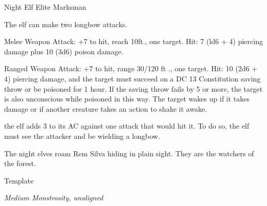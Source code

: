\begin{monsterbox}{Night Elf Elite Marksman}
	\begin{monsteraction}[Multiattack]
		The elf can make two longbow attacks.
	\end{monsteraction}
	\begin{monsteraction}[Shortsword]
		Melee Weapon Attack: +7 to hit, reach 10ft., one target. Hit: 7 (ld6 + 4) piercing damage plus 10 (3d6) poison damage.
	\end{monsteraction}
	\begin{monsteraction}[Longbow]
		Ranged Weapon Attack: +7 to hit, range 30/120 ft ., one target. Hit: 10 (2d6 + 4) piercing damage, and the target must succeed on a DC 13 Constitution saving throw or	be poisoned for 1 hour. If the saving throw fails by 5 or more,	the target is also unconscious while poisoned in this way. The target wakes up if it takes damage or if another creature takes an action to shake it awake.
	\end{monsteraction}
	\begin{monsteraction}
		the elf adds 3 to its AC against one attack that would hit it. To do so, the elf must see the attacker and be
		wielding a longbow.
	\end{monsteraction}
	The night elves roam Rem Silva hiding in plain sight. They are the watchers of the forest. 
\end{monsterbox}

\begin{monsterbox}{Template}
	\begin{hangingpar}
		\textit{Medium Monstrosity, unaligned}
	\end{hangingpar}
	\dndline%
	\basics[%
	armorclass = 15,
	hitpoints  = 52,
	speed      = 20 ft
	]
	\dndline%
	\stats[
	STR = \stat{16}, %
	DEX = \stat{8},
	CON = \stat{15},
	INT = \stat{2},
	WIS = \stat{8},
	CHA = \stat{7}
	]
	\dndline%
	\details[%
	senses = {passive perception 9},
	challenge = 3 (700XP)
	]
	\dndline%
	\begin{monsteraction}
		
	\end{monsteraction}	
	
	\begin{monsteraction}[Bite]
		
	\end{monsteraction}
\end{monsterbox}

